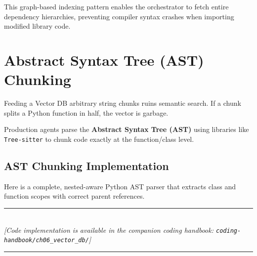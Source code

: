 This graph-based indexing pattern enables the orchestrator to fetch entire dependency hierarchies, preventing compiler syntax crashes when importing modified library code.

\section{Abstract Syntax Tree (AST) Chunking}

Feeding a Vector DB arbitrary string chunks ruins semantic search. If a chunk splits a Python function in half, the vector is garbage.

Production agents parse the \textbf{Abstract Syntax Tree (AST)} using libraries like \texttt{Tree-sitter} to chunk code exactly at the function/class level.

\subsection{AST Chunking Implementation}
Here is a complete, nested-aware Python AST parser that extracts class and function scopes with correct parent references.


\begin{center}
\noindent\rule{0.6\textwidth}{0.4pt} \\
\vspace{0.3em}
\textit{[Code implementation is available in the companion coding handbook: \texttt{coding-handbook/ch06\_vector\_db/}]} \\
\noindent\rule{0.6\textwidth}{0.4pt}
\end{center}

